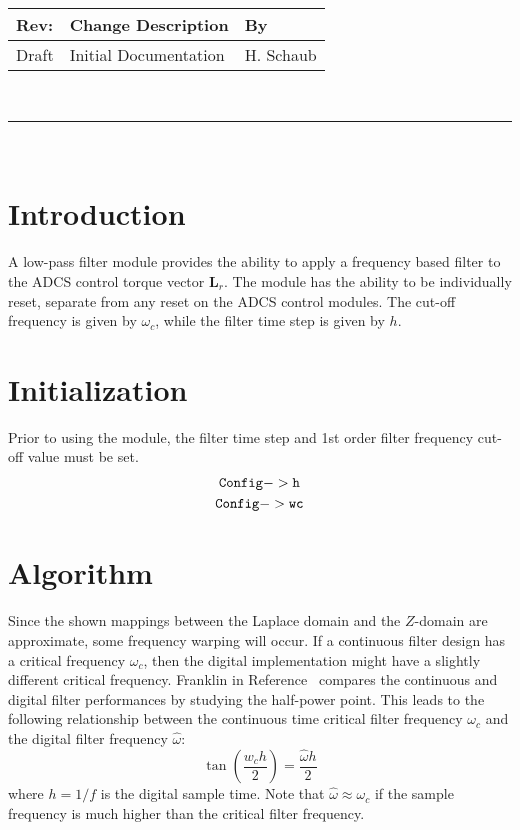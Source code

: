 \documentclass[]{BasiliskReportMemo}
\begin{document}
\makeCover



%
%
\pagestyle{empty}
{\renewcommand{\arraystretch}{2}
\noindent
\begin{longtable}{|p{0.5in}|p{4.5in}|p{1.14in}|}
\hline
{\bfseries Rev}: & {\bfseries Change Description} & {\bfseries By} \\
\hline
Draft & Initial Documentation & H. Schaub \\
\hline

\end{longtable}
}

\newpage
\setcounter{page}{1}
\pagestyle{fancy}

\tableofcontents
~\\ \hrule ~\\

\section{Introduction}
A low-pass filter module provides the ability to apply a frequency based filter to the ADCS control torque vector $\bm L_{r}$.  The module has the ability to be individually reset, separate from any reset on the ADCS control modules.  The cut-off frequency is given by $\omega_{c}$, while the filter time step is given by $h$.  

\section{Initialization}
Prior to using the module, the filter time step and 1st order filter frequency cut-off value must be set.
\begin{gather*}
{\tt Config->h} \\
 {\tt Config->wc} 
\end{gather*}

\section{Algorithm}
Since the shown mappings between the Laplace domain and the $Z$-domain 
are approximate, some frequency warping will occur.  If a continuous 
filter design has a critical frequency $\omega_{c}$, then the digital 
implementation might have a slightly different critical frequency.  
Franklin in Reference~ compares the continuous and 
digital filter performances by studying the half-power point.  This 
leads to the following relationship between the continuous time 
critical filter frequency $\omega_{c}$ and the digital filter 
frequency $\hat\omega$:
\begin{equation}
	\label{eq:wa}
	\tan \left(\frac{ w_{c} h}{2}\right) = \frac{\hat\omega h}{2}
\end{equation}
where $h=1/f$ is the digital sample time.  Note that $\hat\omega \approx 
\omega_{c}$ if the sample frequency is much higher than the critical 
filter frequency. 
\end{document}
